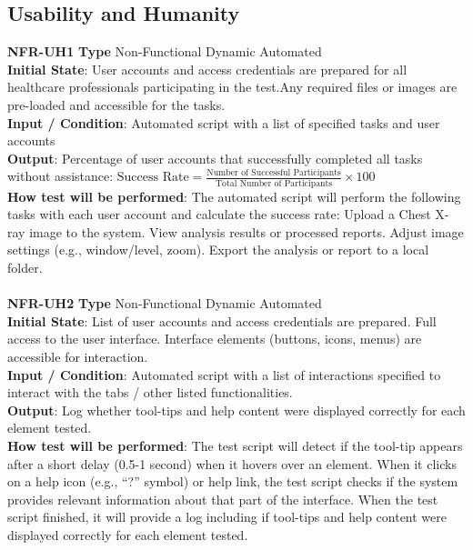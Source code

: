 \documentclass[12pt, titlepage]{article}
\begin{document}
\subsection{Usability and Humanity}
\noindent \textbf{NFR-UH1} \textbf{Type} Non-Functional Dynamic Automated \\
        \indent \textbf{Initial State}: User accounts and access credentials are prepared for all healthcare professionals participating in the test.Any required files or images are pre-loaded and accessible for the tasks.\\
        \indent \textbf{Input / Condition}: Automated script with a list of specified tasks and user accounts\\
        \indent \textbf{Output}: Percentage of user accounts that successfully completed all tasks without assistance: $\text{Success Rate} = \frac{\text{Number of Successful Participants}}{\text{Total Number of Participants}} \times 100$ \\
        \indent \textbf{How test will be performed}: The automated script will perform the following tasks with each user account and calculate the success rate: Upload a Chest X-ray image to the system. View analysis results or processed reports. Adjust image settings (e.g., window/level, zoom). Export the analysis or report to a local folder. \\ 
\\
\textbf{NFR-UH2} \textbf{Type} Non-Functional Dynamic Automated \\
        \indent \textbf{Initial State}: List of user accounts and access credentials are prepared. Full access to the user interface. Interface elements (buttons, icons, menus) are accessible for interaction.\\
        \indent \textbf{Input / Condition}: Automated script with a list of interactions specified to interact with the tabs / other listed functionalities.\\
        \indent \textbf{Output}: Log whether tool-tips and help content were displayed correctly for each element tested.\\
        \indent \textbf{How test will be performed}: The test script will detect if the tool-tip appears after a short delay (0.5-1 second) when it hovers over an element. When it clicks on a help icon (e.g., “?” symbol) or help link, the test script checks if the system provides relevant information about that part of the interface. When the test script finished, it will provide a log including if tool-tips and help content were displayed correctly for each element tested. \\
\end{document}

